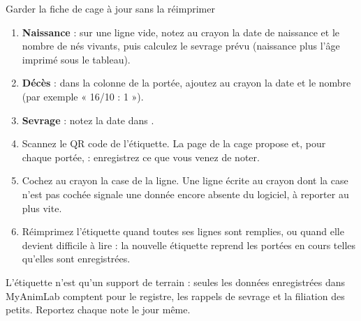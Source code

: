 \documentclass[11pt,a4paper]{article}
\begin{document}
\begin{procedure}{Garder la fiche de cage à jour sans la réimprimer}
\begin{enumerate}
  \item \textbf{Naissance} : sur une ligne vide, notez au crayon la date de
    naissance et le nombre de nés vivants, puis calculez le sevrage prévu
    (naissance plus l'âge imprimé sous le tableau).
  \item \textbf{Décès} : dans la colonne  de la portée, ajoutez
    au crayon la date et le nombre (par exemple « 16/10 : 1 »).
  \item \textbf{Sevrage} : notez la date dans .
  \item Scannez le QR code de l'étiquette. La page de la cage propose
     et, pour chaque portée,
     : enregistrez ce que vous venez de noter.
  \item Cochez au crayon la case  de la ligne. Une ligne écrite
    au crayon dont la case n'est pas cochée signale une donnée encore absente
    du logiciel, à reporter au plus vite.
  \item Réimprimez l'étiquette quand toutes ses lignes sont remplies, ou
    quand elle devient difficile à lire : la nouvelle étiquette reprend les
    portées en cours telles qu'elles sont enregistrées.
\end{enumerate}
\end{procedure}
\begin{regle}
L'étiquette n'est qu'un support de terrain : seules les données enregistrées
dans MyAnimLab comptent pour le registre, les rappels de sevrage et la
filiation des petits. Reportez chaque note le jour même.
\end{regle}
\end{document}
